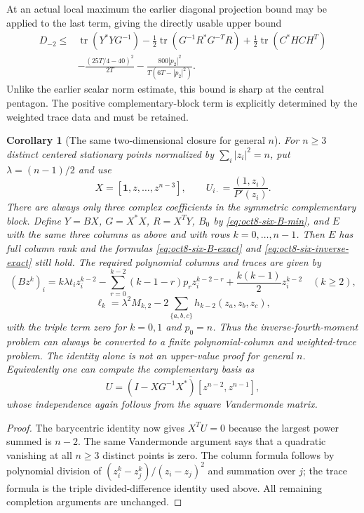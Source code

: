 \documentclass[11pt]{article}
\newtheorem{corollary}[theorem]{Corollary}
\theoremstyle{remark}
\numberwithin{equation}{section}
\begin{document}
At an actual local maximum the earlier diagonal projection bound may
be applied to the last term, giving the directly usable upper bound
\begin{align*}
 D_{-2}\le{}&\operatorname{tr}(Y^*YG^{-1})
 -\frac12\operatorname{tr}(G^{-1}R^*G^{-T}R)
 +\frac12\operatorname{tr}(C^*HCH^T)\\
 &-\frac{(25T/4-40)^2}{2T}
              -\frac{800|p_2|^2}{T(6T-|p_2|^2)}.
\end{align*}
Unlike the earlier scalar norm estimate, this bound is sharp at the
central pentagon. The positive complementary-block term is explicitly
determined by the weighted trace data and must be retained.

\begin{corollary}[The same two-dimensional closure for general $n$]
\label{cor:oct8-general-trace-completion}
For $n\ge3$ distinct centered stationary points normalized by
$\sum_i|z_i|^2=n$, put $\lambda=(n-1)/2$ and use
\[
 X=[\mathbf1,z,\ldots,z^{n-3}],\qquad
 U_{i\cdot}=\frac{(1,z_i)}{P'(z_i)}.
\]
There are always only three complex coefficients in the symmetric
complementary block. Define $Y=BX$, $G=X^*X$, $R=X^TY$, $B_0$ by
\eqref{eq:oct8-six-B-min}, and $E$ with the same three columns as
above and with rows $k=0,\ldots,n-1$. Then $E$ has full column rank
and the formulas \eqref{eq:oct8-six-B-exact} and
\eqref{eq:oct8-six-inverse-exact} still hold. The required polynomial
columns and traces are given by
\[
 (Bz^k)_i=k\lambda t_i z_i^{k-2}
 -\sum_{r=0}^{k-2}(k-1-r)p_r z_i^{k-2-r}
                       +\frac{k(k-1)}2z_i^{k-2}\quad(k\ge2),
\]
\[
 \ell_k=\lambda^2 M_{k,2}
 -2\sum_{\{a,b,c\}}h_{k-2}(z_a,z_b,z_c),
\]
with the triple term zero for $k=0,1$ and $p_0=n$.
Thus the inverse-fourth-moment problem can always be converted to a
finite polynomial-column and weighted-trace problem. The identity
alone is not an upper-value proof for general $n$.
Equivalently one can compute the complementary basis as
\[
 U=\overline{(I-XG^{-1}X^*)[z^{n-2},z^{n-1}]},
\]
whose independence again follows from the square Vandermonde matrix.
\end{corollary}
\begin{proof}
The barycentric identity now gives $X^TU=0$ because the largest
power summed is $n-2$. The same Vandermonde argument says that a
quadratic vanishing at all $n\ge3$ distinct points is zero.
The column formula follows by polynomial division of
$(z_i^k-z_j^k)/(z_i-z_j)^2$ and summation over $j$; the trace
formula is the triple divided-difference identity used above.
All remaining completion arguments are unchanged.
\end{proof}
\end{document}
